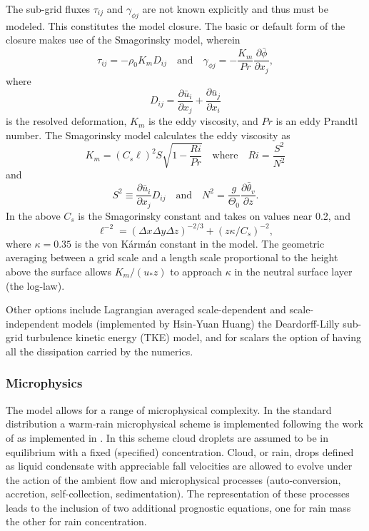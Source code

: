 \documentclass[11pt,a4paper]{article}
\begin{document}
The sub-grid fluxes $\tau_{ij}$ and $\gamma_{\phi j}$ are not known
explicitly and thus must be modeled.  This constitutes the model
closure.  The basic or default form of the closure makes use of the
Smagorinsky model, wherein
\begin{equation}
\tau_{ij} = - \rho_0 K_mD_{ij} \quad \text{and} \quad \gamma_{\phi j}
= - \frac{K_m}{Pr} \frac{\partial \bar{\phi}} {\partial x_j},
\end{equation}
where \[D_{ij} = \frac{\partial \bar{u}_i}{\partial x_j} +
\frac{\partial \bar{u}_j}{\partial x_i}\] is the resolved deformation,
$K_m$ is the eddy viscosity, and $Pr$ is an eddy Prandtl number.  The
Smagorinsky model calculates the eddy viscosity as
\begin{equation}
K_m = (C_s \ell)^2 S \sqrt{1 - \frac{Ri}{Pr}} \quad \text{where} \quad
Ri =
\frac{S^2}{N^2}
\end{equation}
and
\begin{equation}
S^2 \equiv \frac{\partial \bar{u}_i}{\partial x_j} D_{ij} \quad
\text{and} \quad N^2 = \frac{g}{\Theta_0} \frac{\partial
\bar{\theta}_v}{\partial z}.
\end{equation}
In the above $C_s$ is the Smagorinsky constant and takes on values
near 0.2, and
\[ \ell^{-2} = (\Delta x \Delta y \Delta z)^{-2/3} + (z\kappa/C_s)^{-2},
\]  where $\kappa=0.35$ is the von K\'arm\'an constant in the model.   The
geometric averaging between a grid scale and a length scale proportional
to the height above the surface allows $K_m/(u_*z)$ to approach
$\kappa$ in the neutral surface layer (the log-law).

Other options include Lagrangian averaged scale-dependent and
scale-independent models (implemented by Hsin-Yuan Huang) the
Deardorff-Lilly sub-grid turbulence kinetic energy (TKE) model, and
for scalars the option of having all the dissipation carried by the
numerics.

\subsubsection{Microphysics}

The model allows for a range of microphysical complexity.  In the
standard distribution a warm-rain microphysical scheme is implemented
following the work of \cite{Seife:2001} as implemented in \cite{Me:2008}.
In this scheme cloud droplets are assumed to be in equilibrium with a fixed
(specified) concentration.  Cloud, or rain, drops defined as liquid
condensate with appreciable fall velocities are allowed to evolve
under the action of the ambient flow and microphysical processes
(auto-conversion, accretion, self-collection, sedimentation).  The
representation of these processes leads to the inclusion of two
additional prognostic equations, one for rain mass the other for rain
concentration.
\end{document}
